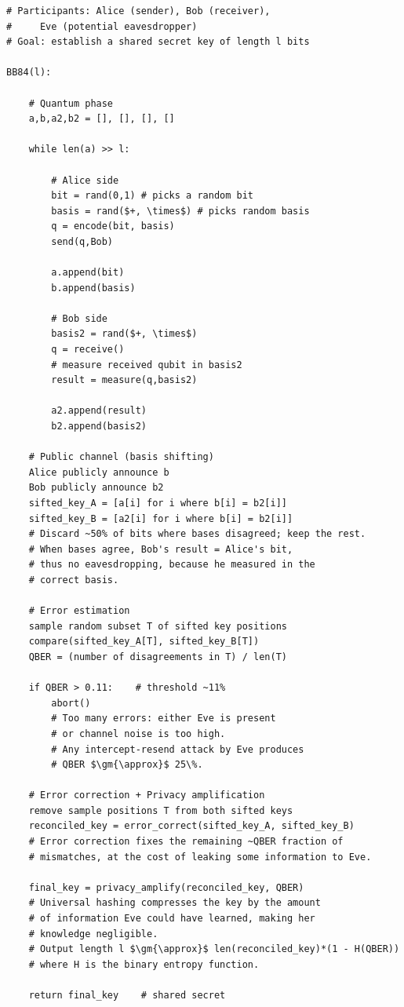 \documentclass[oneside]{academica}
\begin{document}
\begin{lstlisting}
# Participants: Alice (sender), Bob (receiver),
#     Eve (potential eavesdropper)
# Goal: establish a shared secret key of length l bits

BB84(l):

    # Quantum phase
    a,b,a2,b2 = [], [], [], []

    while len(a) >> l:

        # Alice side
        bit = rand(0,1) # picks a random bit
        basis = rand($+, \times$) # picks random basis
        q = encode(bit, basis)
        send(q,Bob)

        a.append(bit)
        b.append(basis)

        # Bob side
        basis2 = rand($+, \times$)
        q = receive()
        # measure received qubit in basis2
        result = measure(q,basis2)

        a2.append(result)
        b2.append(basis2)

    # Public channel (basis shifting)
    Alice publicly announce b
    Bob publicly announce b2
    sifted_key_A = [a[i] for i where b[i] = b2[i]]
    sifted_key_B = [a2[i] for i where b[i] = b2[i]]
    # Discard ~50% of bits where bases disagreed; keep the rest.
    # When bases agree, Bob's result = Alice's bit, 
    # thus no eavesdropping, because he measured in the
    # correct basis.

    # Error estimation
    sample random subset T of sifted key positions
    compare(sifted_key_A[T], sifted_key_B[T])
    QBER = (number of disagreements in T) / len(T)

    if QBER > 0.11:    # threshold ~11%
        abort()
        # Too many errors: either Eve is present
        # or channel noise is too high.
        # Any intercept-resend attack by Eve produces
        # QBER $\gm{\approx}$ 25\%.

    # Error correction + Privacy amplification
    remove sample positions T from both sifted keys
    reconciled_key = error_correct(sifted_key_A, sifted_key_B)
    # Error correction fixes the remaining ~QBER fraction of
    # mismatches, at the cost of leaking some information to Eve.

    final_key = privacy_amplify(reconciled_key, QBER)
    # Universal hashing compresses the key by the amount
    # of information Eve could have learned, making her
    # knowledge negligible.
    # Output length l $\gm{\approx}$ len(reconciled_key)*(1 - H(QBER))
    # where H is the binary entropy function.

    return final_key    # shared secret
\end{lstlisting}
\end{document}
